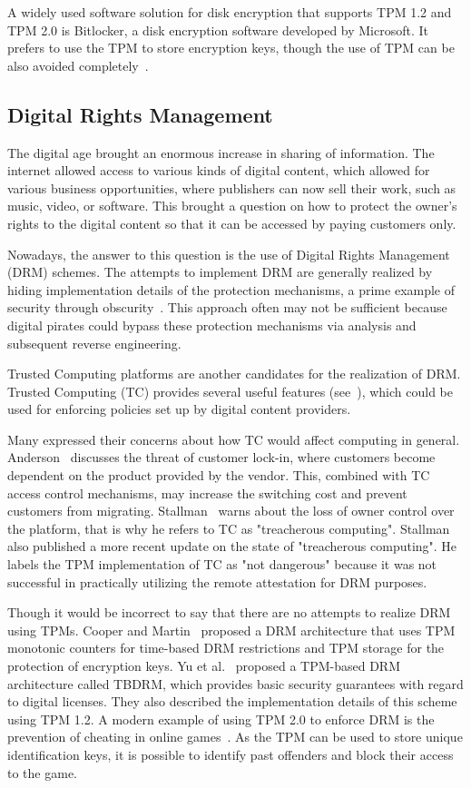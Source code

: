 A widely used software solution for disk encryption that supports TPM 1.2 and TPM 2.0 is Bitlocker, a disk encryption software developed by Microsoft. It prefers to use the TPM to store encryption keys, though the use of TPM can be also avoided completely~\cite{bitlockerMDocs}.

\subsection{Digital Rights Management}
The digital age brought an enormous increase in sharing of information. The internet allowed access to various kinds of digital content, which allowed for various business opportunities, where publishers can now sell their work, such as music, video, or software. This brought a question on how to protect the owner's rights to the digital content so that it can be accessed by paying customers only.

Nowadays, the answer to this question is the use of Digital Rights Management (DRM) schemes. The attempts to implement DRM are generally realized by hiding implementation details of the protection mechanisms, a prime example of security through obscurity~\cite{liu2003digital}. This approach often may not be sufficient because digital pirates could bypass these protection mechanisms via analysis and subsequent reverse engineering.

Trusted Computing platforms are another candidates for the realization of DRM. Trusted Computing (TC) provides several useful features (see~), which could be used for enforcing policies set up by digital content providers.

Many expressed their concerns about how TC would affect computing in general. Anderson~\cite{anderson2003cryptography} discusses the threat of customer lock-in, where customers become dependent on the product provided by the vendor. This, combined with TC access control mechanisms, may increase the switching cost and prevent customers from migrating. Stallman~\cite{stallman2002treacherous} warns about the loss of owner control over the platform, that is why he refers to TC as "treacherous computing". Stallman~\cite{stallman2002treacherous} also published a more recent update on the state of "treacherous computing". He labels the TPM implementation of TC as "not dangerous" because it was not successful in practically utilizing the remote attestation for DRM purposes. 

Though it would be incorrect to say that there are no attempts to realize DRM using TPMs. Cooper and Martin~\cite{cooperMartinDRM2006} proposed a DRM architecture that uses TPM monotonic counters for time-based DRM restrictions and TPM storage for the protection of encryption keys. Yu et al.~\cite{yu2009tbdrm} proposed a TPM-based DRM architecture called TBDRM, which provides basic security guarantees with regard to digital licenses. They also described the implementation details of this scheme using TPM 1.2. A modern example of using TPM 2.0 to enforce DRM is the prevention of cheating in online games~\cite{gamesDrmTpm}. As the TPM can be used to store unique identification keys, it is possible to identify past offenders and block their access to the game.

